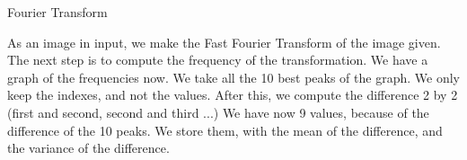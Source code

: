 Fourier Transform

As an image in input, we make the Fast Fourier Transform of the image given. The next step is to compute the frequency of the transformation. We have a graph of the frequencies now. We take all the 10 best peaks of the graph. We only keep the indexes, and not the values. After this, we compute the difference 2 by 2 (first and second, second and third ...) We have now 9 values, because of the difference of the 10 peaks. We store them, with the mean of the difference, and the variance of the difference.
    